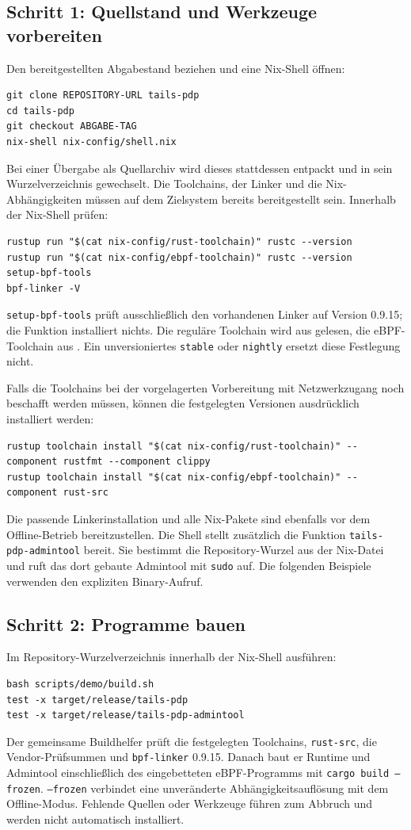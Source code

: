 \documentclass[12pt,a4paper]{article}
\begin{document}
\subsection{Schritt 1: Quellstand und Werkzeuge vorbereiten}
Den bereitgestellten Abgabestand beziehen und eine Nix-Shell öffnen:
\begin{lstlisting}
git clone REPOSITORY-URL tails-pdp
cd tails-pdp
git checkout ABGABE-TAG
nix-shell nix-config/shell.nix
\end{lstlisting}
Bei einer Übergabe als Quellarchiv wird dieses stattdessen entpackt und in sein
Wurzelverzeichnis gewechselt. Die Toolchains, der Linker und die Nix-Abhängigkeiten
müssen auf dem Zielsystem bereits bereitgestellt sein. Innerhalb der Nix-Shell prüfen:
\begin{lstlisting}
rustup run "$(cat nix-config/rust-toolchain)" rustc --version
rustup run "$(cat nix-config/ebpf-toolchain)" rustc --version
setup-bpf-tools
bpf-linker -V
\end{lstlisting}
\texttt{setup-bpf-tools} prüft ausschließlich den vorhandenen Linker auf Version
0.9.15; die Funktion installiert nichts. Die reguläre Toolchain wird aus
 gelesen, die eBPF-Toolchain aus
. Ein unversioniertes \texttt{stable} oder
\texttt{nightly} ersetzt diese Festlegung nicht.

Falls die Toolchains bei der vorgelagerten Vorbereitung mit Netzwerkzugang noch
beschafft werden müssen, können die festgelegten Versionen ausdrücklich installiert werden:
\begin{lstlisting}
rustup toolchain install "$(cat nix-config/rust-toolchain)" --component rustfmt --component clippy
rustup toolchain install "$(cat nix-config/ebpf-toolchain)" --component rust-src
\end{lstlisting}
Die passende Linkerinstallation und alle Nix-Pakete sind ebenfalls vor dem
Offline-Betrieb bereitzustellen. Die Shell stellt zusätzlich die Funktion
\texttt{tails-pdp-admintool} bereit. Sie bestimmt die Repository-Wurzel aus der
Nix-Datei und ruft das dort gebaute Admintool mit \texttt{sudo} auf.
Die folgenden Beispiele verwenden den expliziten Binary-Aufruf.

\subsection{Schritt 2: Programme bauen}
Im Repository-Wurzelverzeichnis innerhalb der Nix-Shell ausführen:
\begin{lstlisting}
bash scripts/demo/build.sh
test -x target/release/tails-pdp
test -x target/release/tails-pdp-admintool
\end{lstlisting}
Der gemeinsame Buildhelfer prüft die festgelegten Toolchains, \texttt{rust-src},
die Vendor-Prüfsummen und \texttt{bpf-linker} 0.9.15. Danach baut er Runtime und
Admintool einschließlich des eingebetteten eBPF-Programms mit
\texttt{cargo build --frozen}. \texttt{--frozen} verbindet eine unveränderte
Abhängigkeitsauflösung mit dem Offline-Modus. Fehlende Quellen oder Werkzeuge
führen zum Abbruch und werden nicht automatisch installiert.
\end{document}
